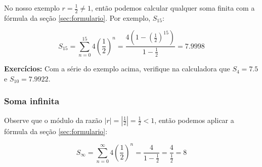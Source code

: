 \documentclass[a4paper]{article}
\begin{document}
No nosso exemplo $r = \frac{1}{2} \ne 1$, então podemos calcular
qualquer soma finita com a fórmula da seção \ref{sec:formulario}. Por
exemplo, $S_{15}$:

\begin{displaymath}
  S_{15} = \sum_{n=0}^{15} 4\left(\frac{1}{2}\right)^n =
  \frac{4\left(1-\left(\frac{1}{2}\right)^{15}\right)}{1-\frac{1}{2}} = 7.9998
\end{displaymath}

{\bf Exercícios:} Com a série do exemplo acima, verifique na
calculadora que $S_4=7.5$ e $S_{10}=7.9922$.

\subsubsection{Soma infinita}

Observe que o módulo da razão
$|r|=\left|\frac{1}{2}\right|=\frac{1}{2} <1$, então podemos aplicar a
fórmula da seção \ref{sec:formulario}:

\begin{displaymath}
  S_\infty = \sum_{n=0}^\infty 4\left(\frac{1}{2}\right)^n =
  \frac{4}{1-\frac{1}{2}} = \frac{4}{\frac{1}{2}} = 8
\end{displaymath}
\end{document}
